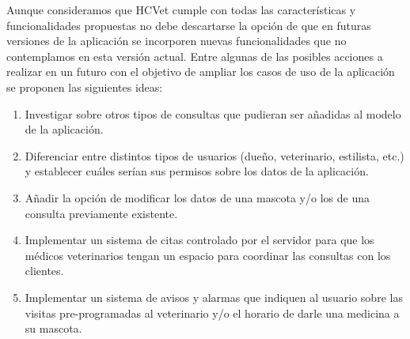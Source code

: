\begin{recomendations}
    Aunque consideramos que HCVet cumple con todas las características y funcionalidades propuestas no debe descartarse la opción de que en futuras versiones de la aplicación se incorporen nuevas funcionalidades que no contemplamos en esta versión actual. Entre algunas de las posibles acciones a realizar en un futuro con el objetivo de ampliar los casos de uso de la aplicación se proponen las siguientes ideas:

\begin{enumerate}


\item Investigar sobre otros tipos de consultas que pudieran ser añadidas al modelo de la aplicación.

\item Diferenciar entre distintos tipos de usuarios (dueño, veterinario, estilista, etc.) y establecer cuáles serían sus permisos sobre los datos de la aplicación.

\item Añadir la opción de modificar los datos de una mascota y/o los de una consulta previamente existente.

\item Implementar un sistema de citas controlado por el servidor para que los médicos veterinarios tengan un espacio para coordinar las consultas con los clientes.

\item Implementar un sistema de avisos y alarmas que indiquen al usuario sobre las visitas pre-programadas al veterinario y/o el horario de darle una medicina a su mascota.
\end{enumerate}
\end{recomendations}
